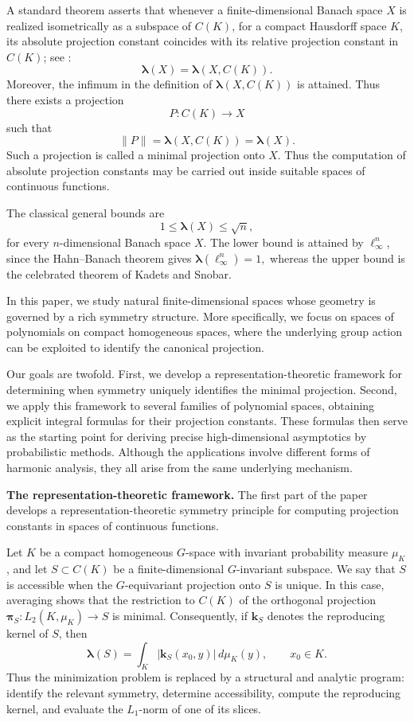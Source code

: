 \documentclass[11pt,showkeys]{amsart}
\begin{document}
A standard theorem asserts that whenever a finite-dimensional Banach space \(X\) is realized isometrically as
a subspace of \(C(K)\), for a compact Hausdorff space $K$, its absolute projection constant coincides with
its relative projection constant in \(C(K)\); see \cite[Theorem~III.B.5]{wojtaszczyk1996banach}:
\[
        \boldsymbol\lambda(X)
        =
        \boldsymbol\lambda(X,C(K)).
\]
Moreover, the infimum in the definition of \(\boldsymbol\lambda(X,C(K))\) is
attained. Thus there exists a projection
\[
        P:C(K)\longrightarrow X
\]
such that
\[
        \|P\|
        =
        \boldsymbol\lambda(X,C(K))
        =
        \boldsymbol\lambda(X).
\]
Such a projection is called a minimal projection onto \(X\).
Thus the computation of absolute projection constants may be carried out
inside suitable spaces of continuous functions.

The classical general bounds
are
$$
1
\leq
\boldsymbol\lambda(X)
\leq
\sqrt{n},$$
for every \(n\)-dimensional Banach space \(X\).
The lower bound is attained by \(\ell_\infty^n\), since the Hahn--Banach
theorem gives
$
\boldsymbol\lambda(\ell_\infty^n)=1,
$
whereas the upper bound is the celebrated theorem of Kadets and Snobar.



In this paper, we study natural finite-dimensional spaces whose geometry is
governed by a rich symmetry structure. More specifically, we focus on spaces
of polynomials on compact homogeneous spaces, where the underlying group
action can be exploited to identify the canonical projection.

Our goals are twofold. First, we develop a representation-theoretic framework
for determining when symmetry uniquely identifies the minimal projection.
Second, we apply this framework to several families of polynomial spaces, obtaining explicit integral formulas for their projection constants. These formulas then serve as the starting point for deriving precise high-dimensional asymptotics by probabilistic methods. Although
the applications involve different forms of harmonic analysis, they all arise
from the same underlying mechanism.



\medskip


\textbf{The representation-theoretic framework.}
The first part of the paper develops a representation-theo\-retic symmetry
principle for computing projection constants in spaces of continuous
functions.

Let \(K\) be a compact homogeneous \(G\)-space with invariant probability
measure \(\mu_K\), and let \(S\subset C(K)\) be a finite-dimensional
\(G\)-invariant subspace. We say that \(S\) is accessible when the
\(G\)-equivariant projection onto \(S\) is unique. In this case, averaging
shows that the restriction to \(C(K)\) of the orthogonal projection
\(\mathbf\pi_S:L_2(K,\mu_K)\to S\) is minimal. Consequently, if \(\mathbf k_S\) denotes the
reproducing kernel of \(S\), then
$$
\boldsymbol\lambda(S)
=
\int_K |\mathbf k_S(x_0,y)|\,d\mu_K(y),
\qquad x_0\in K.
$$
Thus the minimization problem is replaced by a structural and analytic
program: identify the relevant symmetry, determine accessibility, compute
the reproducing kernel, and evaluate the \(L_1\)-norm of one of its slices.
\end{document}
